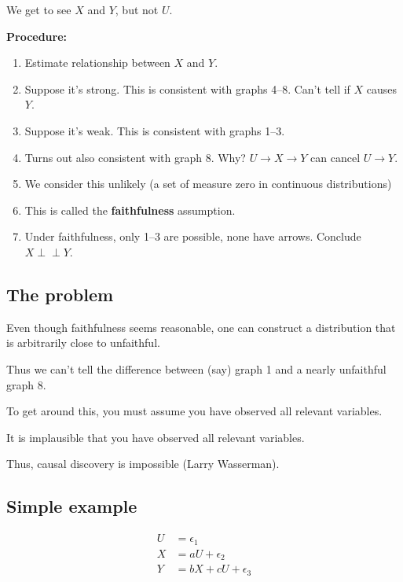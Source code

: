 \documentclass[]{article}
\providecommand{\tightlist}{%
  \setlength{\itemsep}{0pt}\setlength{\parskip}{0pt}}
\begin{document}
We get to see \(X\) and \(Y\), but not \(U\).

\textbf{Procedure:}

\begin{enumerate}
\def\labelenumi{\arabic{enumi}.}
\tightlist
\item
  Estimate relationship between \(X\) and \(Y\).
\item
  Suppose it's strong. This is consistent with graphs 4--8. Can't tell
  if \(X\) causes \(Y\).
\item
  Suppose it's weak. This is consistent with graphs 1--3.
\item
  Turns out also consistent with graph 8. Why?
  \(U\rightarrow X\rightarrow Y\) can cancel \(U\rightarrow Y\).
\item
  We consider this unlikely (a set of measure zero in continuous
  distributions)
\item
  This is called the \textbf{faithfulness} assumption.
\item
  Under faithfulness, only 1--3 are possible, none have arrows. Conclude
  \(X\perp\!\!\!\perp Y\).
\end{enumerate}

\hypertarget{the-problem-1}{%
\subsection{The problem}\label{the-problem-1}}

Even though faithfulness seems reasonable, one can construct a
distribution that is arbitrarily close to unfaithful.

Thus we can't tell the difference between (say) graph 1 and a nearly
unfaithful graph 8.

To get around this, you must assume you have observed all relevant
variables.

It is implausible that you have observed all relevant variables.

Thus, causal discovery is impossible (Larry Wasserman).

\hypertarget{simple-example}{%
\subsection{Simple example}\label{simple-example}}

\[
\begin{aligned}
U &= \epsilon_1\\
X &= a U + \epsilon_2\\
Y &= b X + c U + \epsilon_3
\end{aligned}
\]
\end{document}
